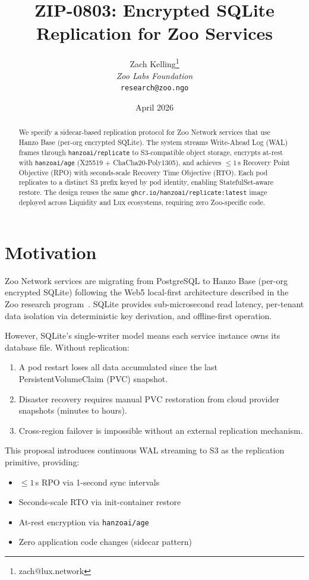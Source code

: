 \documentclass[twocolumn,11pt]{article}
\title{\textbf{ZIP-0803: Encrypted SQLite Replication for Zoo Services}}
\author{
Zach Kelling\thanks{zach@lux.network}\\
\textit{Zoo Labs Foundation}\\
\texttt{research@zoo.ngo}
}
\date{April 2026}
\begin{document}
\maketitle

\begin{abstract}
We specify a sidecar-based replication protocol for Zoo Network services
that use Hanzo Base (per-org encrypted SQLite).  The system streams
Write-Ahead Log (WAL) frames through \texttt{hanzoai/replicate} to
S3-compatible object storage, encrypts at-rest with \texttt{hanzoai/age}
(X25519 + ChaCha20-Poly1305), and achieves $\leq 1$\,s Recovery Point
Objective (RPO) with seconds-scale Recovery Time Objective (RTO).
Each pod replicates to a distinct S3 prefix keyed by pod identity,
enabling StatefulSet-aware restore.  The design reuses the same
\texttt{ghcr.io/hanzoai/replicate:latest} image deployed across
Liquidity and Lux ecosystems, requiring zero Zoo-specific code.
\end{abstract}

\section{Motivation}

Zoo Network services are migrating from PostgreSQL to Hanzo Base
(per-org encrypted SQLite) following the Web5 local-first architecture
described in the Zoo research program~\cite{web5}.  SQLite provides
sub-microsecond read latency, per-tenant data isolation via
deterministic key derivation, and offline-first operation.

However, SQLite's single-writer model means each service instance
owns its database file.  Without replication:

\begin{enumerate}
\item A pod restart loses all data accumulated since the last
  PersistentVolumeClaim (PVC) snapshot.
\item Disaster recovery requires manual PVC restoration from
  cloud provider snapshots (minutes to hours).
\item Cross-region failover is impossible without an external
  replication mechanism.
\end{enumerate}

This proposal introduces continuous WAL streaming to S3 as the
replication primitive, providing:

\begin{itemize}
\item $\leq 1$\,s RPO via 1-second sync intervals
\item Seconds-scale RTO via init-container restore
\item At-rest encryption via \texttt{hanzoai/age}
\item Zero application code changes (sidecar pattern)
\end{itemize}
\end{document}
